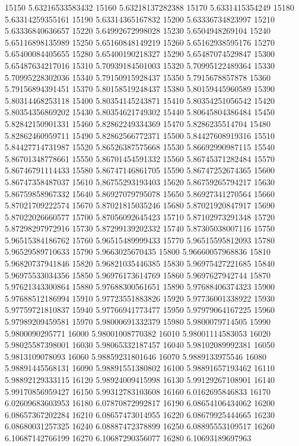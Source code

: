{15150 5.63216533583432
15160 5.63218137282388
15170 5.6331415354249
15180 5.63314259355161
15190 5.63314365167832
15200 5.63336734823997
15210 5.63336840636657
15220 5.64992672998028
15230 5.6504948269104
15240 5.65116898135989
15250 5.65160848149219
15260 5.65162938595176
15270 5.65400084405655
15280 5.65400190218327
15290 5.65487074529847
15300 5.65487634217016
15310 5.70939184501003
15320 5.70995122489364
15330 5.70995228302036
15340 5.79150915928437
15350 5.7915678857878
15360 5.79156894391451
15370 5.80158519248437
15380 5.80159445960589
15390 5.80314468253118
15400 5.80354145243871
15410 5.80354251056542
15420 5.80354356869202
15430 5.80354621749302
15440 5.80645804386484
15450 5.82842150901331
15460 5.82862249334369
15470 5.8286235514704
15480 5.82862460959711
15490 5.82862566772371
15500 5.84427608919316
15510 5.84427714731987
15520 5.86526387575668
15530 5.86692990987115
15540 5.86701348778661
15550 5.86701454591332
15560 5.86745371282484
15570 5.86746791114433
15580 5.86747146861705
15590 5.86747252674365
15600 5.86747358487037
15610 5.86755293193403
15620 5.86759265794217
15630 5.86759858967332
15640 5.86927079795078
15650 5.86927341270564
15660 5.87021709222574
15670 5.87021815035246
15680 5.87021920847917
15690 5.87022026660577
15700 5.87056092645423
15710 5.87102973291348
15720 5.87298297972916
15730 5.87299139202332
15740 5.87305038007116
15750 5.96515384186762
15760 5.96515489999433
15770 5.96515595812093
15780 5.96529589710633
15790 5.9663025670435
15800 5.96660057968836
15810 5.96820737941846
15820 5.96821035446385
15830 5.96975427221685
15840 5.96975533034356
15850 5.96976173614769
15860 5.9697627942744
15870 5.97621343300864
15880 5.97688300561651
15890 5.97688406374323
15900 5.97688512186994
15910 5.97723551883826
15920 5.97736001338922
15930 5.97759721810837
15940 5.97766941773477
15950 5.97979064167225
15960 5.97989209459581
15970 5.98000691332379
15980 5.9800079714505
15990 5.9800090295771
16000 5.98001008770382
16010 5.98001114583053
16020 5.98025587398001
16030 5.98065332187457
16040 5.98102089992381
16050 5.9813109078093
16060 5.98859231801646
16070 5.9889133975546
16080 5.98891445568131
16090 5.98891551380802
16100 5.98891657193462
16110 5.98892129333115
16120 5.98924009415998
16130 5.99129267108901
16140 5.99170856959427
16150 5.99312783103608
16160 6.0162695846833
16170 6.02609683603953
16180 6.07870872992817
16190 6.08654106434062
16200 6.08657367202284
16210 6.08657473014955
16220 6.08679925444665
16230 6.08680031257325
16240 6.08887472378899
16250 6.08895553109517
16260 6.10687142766199
16270 6.10687290356077
16280 6.10693189697963
}
